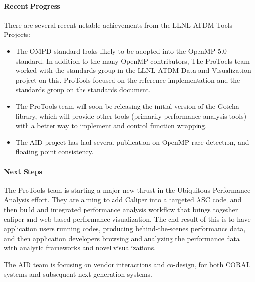 \paragraph{Recent Progress}

There are several recent notable achievements from the LLNL ATDM Tools Projects:
\begin{itemize}
\itemsep 0em
\item The OMPD standard looks likely to be adopted into the OpenMP 5.0 standard.  In addition to the many OpenMP contributors, The ProTools team worked with the standards group in the LLNL ATDM Data and Visualization project on this.  ProTools focused on the reference implementation and the standards group on the standards document.
\item The ProTools team will soon be releasing the initial version of the Gotcha library, which will provide other tools (primarily performance analysis tools) with a better way to implement and control function wrapping.
\item The AID project has had several publication on OpenMP race detection\cite{pmodelconcurrency2018},\cite{swordopenmp2018} and floating point consistency\cite{Flit2017}.
\end{itemize}

\paragraph{Next Steps}

The ProTools team is starting a major new thrust in the Ubiquitous Performance Analysis effort.  They are aiming to add Caliper into a targeted ASC code, and then build and integrated performance analysis workflow that brings together caliper and web-based performance visualization.  The end result of this is to have application users running codes, producing behind-the-scenes performance data, and then application developers browsing and analyzing the performance data with analytic frameworks and novel visualizations.

The AID team is focusing on vendor interactions and co-design, for both CORAL systems and subsequent next-generation systems.

